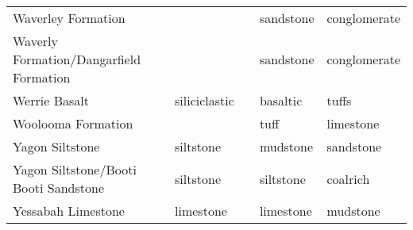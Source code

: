\begin{table}[ht]
\begin{tabular}{lllll}
  Waverley Formation &  &  & sandstone & conglomerate \\ 
  Waverly Formation/Dangarfield  Formation &  &  & sandstone & conglomerate \\ 
  Werrie Basalt & siliciclastic &  & basaltic & tuffs \\ 
  Woolooma Formation &  &  & tuff & limestone \\ 
  Yagon Siltstone & siltstone &  & mudstone & sandstone \\ 
  Yagon Siltstone/Booti Booti Sandstone & siltstone &  & siltstone & coalrich \\ 
  Yessabah Limestone & limestone &  & limestone & mudstone \\ 
   \hline
\end{tabular}
\label{tab:form_lith}
\end{table}
